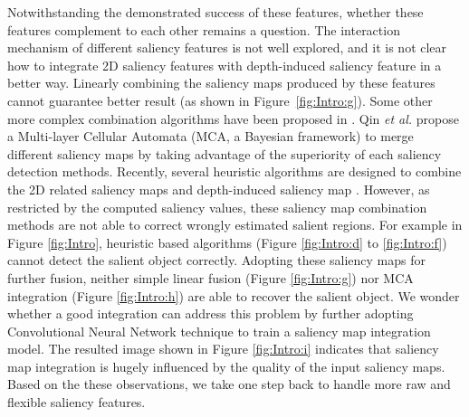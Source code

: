 \documentclass[journal]{IEEEtran}
\begin{document}
Notwithstanding the demonstrated success of these features, whether these features complement to each other remains a question. The interaction mechanism of different saliency features is not well explored, and it is not clear how to integrate 2D saliency features with depth-induced saliency feature in a better way. Linearly combining the saliency maps produced by these features cannot guarantee better result (as shown in Figure~\ref{fig:Intro:g}). Some other more complex combination algorithms have been proposed in \cite{liu2011learning,yan2013hierarchical,qin2015saliency,zhou2015salient,peng2014rgbd,ren2015exploiting}.
Qin \emph{et al.} \cite{qin2015saliency} propose a Multi-layer Cellular Automata (MCA, a Bayesian framework) to merge different saliency maps by taking advantage of the superiority of each saliency detection methods. Recently, several heuristic algorithms are designed to combine the 2D related saliency maps and depth-induced saliency map \cite{peng2014rgbd,ren2015exploiting}.
However, as restricted by the computed saliency values, these saliency map combination methods are not able to correct wrongly estimated salient regions. For example in Figure \ref{fig:Intro}, heuristic based algorithms (Figure \ref{fig:Intro:d} to \ref{fig:Intro:f}) cannot detect the salient object correctly. Adopting these saliency maps for further fusion, neither simple linear fusion (Figure \ref{fig:Intro:g}) nor MCA integration (Figure \ref{fig:Intro:h}) are able to recover the salient object. We wonder whether a good integration can address this problem by further adopting Convolutional Neural Network technique to train a saliency map integration model. The resulted image shown in Figure \ref{fig:Intro:i} indicates that saliency map integration is hugely influenced by the quality of the input saliency maps. Based on the these observations, we take one step back to handle more raw and flexible saliency features.
\end{document}
